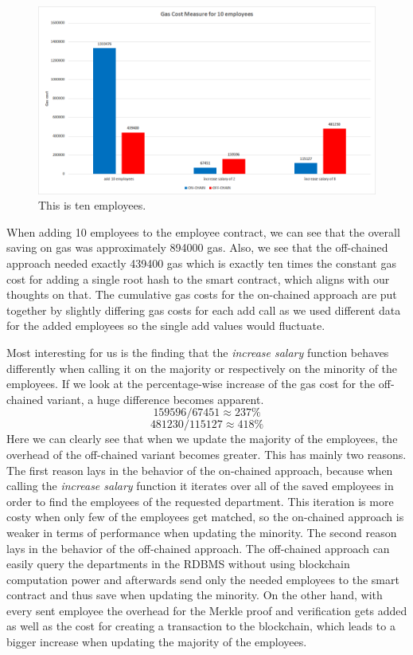 \begin{figure}[t]
	\centering
	\includegraphics[width=1.0\textwidth]{images/05_evaluation/05_gas_cost_ten.png}
	\caption{\label{fig:05_gas_cost_ten}This is ten employees.}
\end{figure}

When adding 10 employees to the employee contract, we can see that the overall saving on gas was approximately 894000 gas.
Also, we see that the off-chained approach needed exactly 439400 gas which is exactly ten times the constant gas cost for adding a single root hash to the smart contract, which aligns with our thoughts on that.
The cumulative gas costs for the on-chained approach are put together by slightly differing gas costs for each add call as we used different data for the added employees so the single add values would fluctuate.

Most interesting for us is the finding that the \textit{increase salary} function behaves differently when calling it on the majority or respectively on the minority of the employees.
If we look at the percentage-wise increase of the gas cost for the off-chained variant, a huge difference becomes apparent.
$$ 159596 / 67451 \approx 237\% $$
$$ 481230 / 115127 \approx 418\% $$
Here we can clearly see that when we update the majority of the employees, the overhead of the off-chained variant becomes greater.
This has mainly two reasons.
The first reason lays in the behavior of the on-chained approach, because when calling the \textit{increase salary} function it iterates over all of the saved employees in order to find the employees of the requested department.
This iteration is more costy when only few of the employees get matched, so the on-chained approach is weaker in terms of performance when updating the minority.
The second reason lays in the behavior of the off-chained approach.
The off-chained approach can easily query the departments in the RDBMS without using blockchain computation power and afterwards send only the needed employees to the smart contract and thus save when updating the minority.
On the other hand, with every sent employee the overhead for the Merkle proof and verification gets added as well as the cost for creating a transaction to the blockchain, which leads to a bigger increase when updating the majority of the employees.

